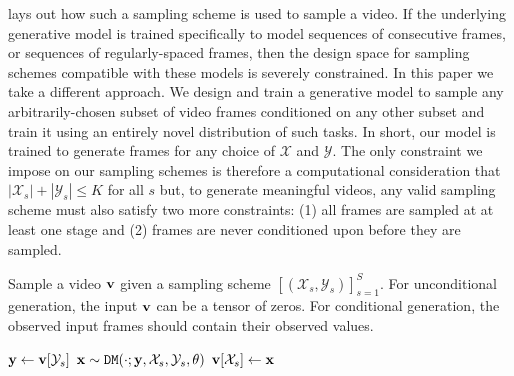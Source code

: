  lays out how such a sampling scheme is used to sample a video. If the underlying generative model is trained specifically to model sequences of consecutive frames, or sequences of regularly-spaced frames, then the design space for sampling schemes compatible with these models is severely constrained. In this paper we take a  different approach.  We design and train a generative model to sample any arbitrarily-chosen subset of video frames conditioned on any other subset and train it using an entirely novel distribution of such tasks. In short, our model is trained to generate frames for any choice of $\mathcal{X}$ and $\mathcal{Y}$. The only constraint we impose on our sampling schemes is therefore a computational consideration that $|\mathcal{X}_s| + |\mathcal{Y}_s| \leq K$ for all $s$ but, to generate meaningful videos, any valid sampling scheme must also satisfy two more constraints: (1) all frames are sampled at at least one stage and (2) frames are never conditioned upon before they are sampled. %

\begin{algorithm}[t]
    \centering
    \caption{Sample a video $\rvv$ given a sampling scheme $[(\mathcal{X}_s,\mathcal{Y}_s)]_{s=1}^S$. For unconditional generation, the input $\rvv$ can be a tensor of zeros. For conditional generation, the observed input frames should contain their observed values.}
    \label{alg:sampling}
    \footnotesize
    \begin{algorithmic}[1]
            \State ${\mathbf{y}} \gets {\mathbf{v}} [\mathcal{Y}_s]$ 
            \State ${\mathbf{x}} \sim  \texttt{DM}(\cdot; {\mathbf{y}}, \mathcal{X}_s, \mathcal{Y}_s, \theta)$  
            \State ${\mathbf{v}} [\mathcal{X}_s] \gets {\mathbf{x}}$ 
        \EndFor
    \EndProcedure
    \State \Return {$\rvv$}
    \end{algorithmic}
\end{algorithm}


